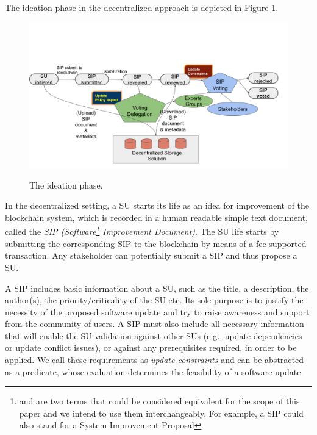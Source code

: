 The ideation phase in the decentralized approach is depicted in Figure \ref{ideation}.
\begin{figure}[h!] %
    \caption{The ideation phase.}
    \centering
    \includegraphics[width=1.0 \columnwidth,keepaspectratio]{figures/ideation_phase.pdf}
    \label{ideation}
\end{figure}
In the decentralized setting, a SU starts its life as an idea for improvement of the blockchain system, which is recorded in a human readable simple text document, called the \emph{SIP (Software\footnote{ and  are two terms that could be considered equivalent for the scope of this paper and we intend to use them interchangeably. For example, a SIP could also stand for a System Improvement Proposal} Improvement Document)}. The SU life starts by submitting the corresponding SIP to the blockchain by means of a fee-supported
 transaction. Any stakeholder can potentially submit a SIP and thus propose a SU. 

A SIP includes basic information about a SU, such as the title, a description, the author(s), the priority/criticality of the SU etc. Its sole purpose is to justify the necessity of the proposed software update and try to raise awareness and support from the community of users. A SIP must also include all necessary information that will enable the SU validation against other SUs (e.g., update dependencies or update conflict issues), or against any prerequisites required, in order to be applied. We call these requirements as \emph{update constraints} and can be abstracted as a predicate, whose evaluation determines the feasibility of a software update.  

